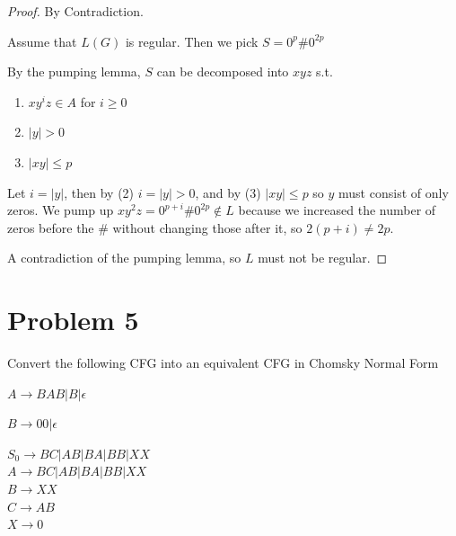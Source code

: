\documentclass[11pt]{article}
\begin{document}
\begin{proof} By Contradiction.

Assume that $L(G)$ is regular. Then we pick $S= 0^p \# 0^{2p}$

By the pumping lemma, $S$ can be decomposed into $xyz$ s.t.

\begin{enumerate}[(1)]
\item $xy^iz \in A$ for $i \geq 0$
\item $|y| > 0$
\item $|xy| \leq p$ 
\end{enumerate}

Let $i = |y|$, then by (2) $i = |y| > 0$, and by (3) $|xy| \leq p$ so $y$ must consist of only zeros. We pump up $xy^2z = 0^{p + i} \# 0^{2p} \notin L$ because we increased the number of zeros before the $\#$ without changing those after it, so $2(p+i) \neq 2p$.

A contradiction of the pumping lemma, so $L$ must not be regular.

\end{proof}

\newpage
\section*{Problem 5}

\noindent
Convert the following CFG into an equivalent CFG in Chomsky Normal Form

$A\rightarrow BAB|B|\epsilon$

$B\rightarrow 00|\epsilon$
\hline


$S_0 \rightarrow BC | AB | BA | BB | XX$\\
$A \rightarrow BC | AB | BA | BB | XX$\\
$B \rightarrow XX$\\
$C \rightarrow AB$\\
$X \rightarrow 0$\\
\end{document}
